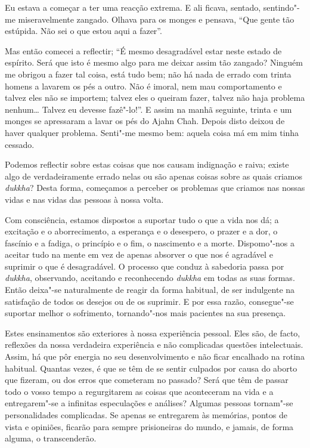 Eu estava a começar a ter uma reacção extrema. E ali ficava, sentado,
sentindo"-me miseravelmente zangado. Olhava para os monges e pensava, “Que gente
tão estúpida. Não sei o que estou aqui a fazer”.

Mas então comecei a reflectir; “É mesmo desagradável estar neste estado de
espírito. Será que isto é mesmo algo para me deixar assim tão zangado? Ninguém
me obrigou a fazer tal coisa, está tudo bem; não há nada de errado com trinta
homens a lavarem os pés a outro. Não é imoral, nem mau comportamento e talvez
eles não se importem; talvez eles o queiram fazer, talvez não haja problema
nenhum\ldots{} Talvez eu devesse fazê"-lo!”. E assim na manhã seguinte, trinta e
um monges se apressaram a lavar os pés do Ajahn Chah. Depois disto deixou de
haver qualquer problema. Senti"-me mesmo bem: aquela coisa má em mim tinha
cessado.

Podemos reflectir sobre estas coisas que nos causam indignação e raiva; existe
algo de verdadeiramente errado nelas ou são apenas coisas sobre as quais criamos
\emph{dukkha}? Desta forma, começamos a perceber os problemas que criamos nas
nossas vidas e nas vidas das pessoas à nossa volta.

Com consciência, estamos dispostos a suportar tudo o que a vida nos dá; a
excitação e o aborrecimento, a esperança e o desespero, o prazer e a dor, o
fascínio e a fadiga, o princípio e o fim, o nascimento e a morte. Dispomo"-nos a
aceitar tudo na mente em vez de apenas absorver o que nos é agradável e suprimir
o que é desagradável. O processo que conduz à sabedoria passa por \emph{dukkha},
observando, aceitando e reconhecendo \emph{dukkha} em todas as suas formas.
Então deixa"-se naturalmente de reagir da forma habitual, de ser indulgente
na satisfação de todos os desejos ou de os suprimir. E por essa razão,
consegue"-se suportar melhor o sofrimento, tornando"-nos mais pacientes na sua presença.

Estes ensinamentos são exteriores à nossa experiência pessoal. Eles são, de
facto, reflexões da nossa verdadeira experiência e não complicadas questões
intelectuais. Assim, há que pôr energia no seu desenvolvimento e não ficar
encalhado na rotina habitual. Quantas vezes, é que se têm de se sentir culpados
por causa do aborto que fizeram, ou dos erros que cometeram no passado? Será que
têm de passar todo o vosso tempo a regurgitarem as coisas que aconteceram na vida e
a entregarem"-se a infinitas especulações e análises? Algumas pessoas tornam"-se
personalidades complicadas. Se apenas se entregarem às memórias, pontos de vista
e opiniões, ficarão para sempre prisioneiras do mundo, e jamais, de forma
alguma, o transcenderão.

